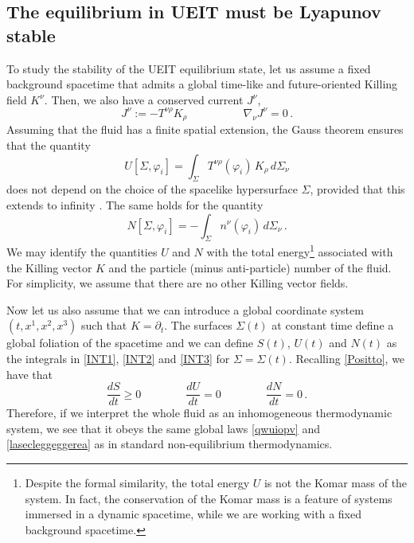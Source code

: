 \documentclass[a4paper, amsfonts, amssymb, amsmath, reprint, twocolumn, showkeys, nofootinbib]{revtex4-2}
\begin{document}


\subsection{The equilibrium in UEIT must be Lyapunov stable}\label{LyiYup}

To study the stability of the UEIT equilibrium state, let us assume a fixed background spacetime that admits a global time-like and future-oriented Killing field $K^\nu$. Then,  we also have a conserved current $J^\nu$,
\begin{equation}
J^\nu := -T^{\nu \rho}K_\rho
\qquad \qquad \quad
\nabla_\nu J^\nu =0 \, .
\end{equation}  
Assuming that the fluid has a finite spatial extension, the Gauss theorem ensures that the quantity \cite{carroll_2019}
\begin{equation}\label{INT2}
U[\Sigma,\varphi_i] = \int_\Sigma T^{\nu \rho}(\varphi_i) \, K_\rho \, d\Sigma_\nu
\end{equation}
does not depend on the choice of the spacelike hypersurface $\Sigma$, provided that this extends to infinity \citep{MTW_book}. The same holds for the quantity
\begin{equation}\label{INT3}
N[\Sigma,\varphi_i] = - \int_\Sigma n^\nu(\varphi_i) \, d\Sigma_\nu \, .
\end{equation}
We may identify the quantities $U$ and $N$ with the total energy\footnote{
Despite the formal similarity, the total energy $U$ is not the Komar mass of the system. In fact, the conservation of the  Komar mass is a feature of systems immersed in a dynamic spacetime, while we are working with a fixed background spacetime.} 
associated with the Killing vector $K$ and the particle (minus anti-particle) number of the fluid. For simplicity, we assume that there are no other Killing vector fields. 

Now let us also assume that we can introduce a global coordinate system $(t,x^1,x^2,x^3)$ such that $K = \partial_t$.
The surfaces $\Sigma(t)$ at constant time define a global foliation of the spacetime and we can define $S(t)$, $U(t)$ and $N(t)$ as the integrals in \eqref{INT1}, \eqref{INT2} and \eqref{INT3} for $\Sigma=\Sigma(t)$. Recalling \eqref{Positto}, we have that
\begin{equation}
\label{ilGhoulGourmet}
\dfrac{dS}{dt} \geq 0   \qquad \qquad   
\dfrac{dU}{dt}= 0   \qquad \qquad    
\dfrac{dN}{dt} =0 \, .
\end{equation}
Therefore, if we interpret the whole fluid as an inhomogeneous thermodynamic system, we see that it obeys the same global laws \eqref{qwuiopv} and \eqref{lasecleggeggerea} as in standard non-equilibrium thermodynamics.
\end{document}
